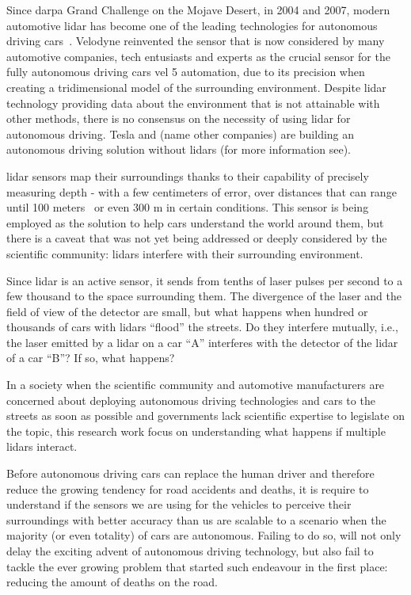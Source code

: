 Since \ac{darpa} Grand Challenge on the Mojave Desert, in 2004 and 2007, modern automotive \ac{lidar} has become one of the leading technologies for autonomous driving cars~\cite{Bezemek2017}. Velodyne reinvented the sensor that is now considered by many automotive companies, tech entusiasts and experts as the crucial sensor for the fully autonomous driving cars vel 5 automation, due to its precision when creating a tridimensional  model of the surrounding environment. Despite \ac{lidar} technology providing data about the environment that is not attainable with other methods, there is no consensus on the necessity of using \ac{lidar} for autonomous driving. Tesla and (name other companies) are building an autonomous driving solution without \acp{lidar} (for more information see). 


\ac{lidar} sensors map their surroundings thanks to their capability of precisely measuring depth - with a few centimeters of error, over distances that can range until 100 meters~\cite{vlp16, Sullivan2016} or even 300 m in certain conditions. This sensor is being employed as the solution to help cars understand the world around them, but there is a caveat that was not yet being addressed or deeply considered by the scientific community: \acp{lidar} interfere with their surrounding environment.

Since \ac{lidar} is an active sensor, it sends from tenths of laser pulses per second to a few thousand to the space surrounding them. The divergence of the laser and the field of view of the detector are small, but what happens when hundred or thousands of cars with \acp{lidar} ``flood'' the streets. Do they interfere mutually, i.e., the laser emitted by a \ac{lidar} on a car ``A'' interferes with the detector of the \ac{lidar} of a car ``B''? If so, what happens? 

In a society when the scientific community and automotive manufacturers are concerned about deploying autonomous driving technologies and cars to the streets as soon as possible and governments lack scientific expertise to legislate on the topic, this research work focus on understanding what happens if multiple \acp{lidar} interact.

Before autonomous driving cars can replace the human driver and therefore reduce the growing tendency for road accidents and deaths, it is require to understand if the sensors we are using for the vehicles to perceive their surroundings with better accuracy than us are scalable to a scenario when the majority (or even totality) of cars are autonomous. Failing to do so, will not only delay the exciting advent of autonomous driving technology, but also fail to tackle the ever growing problem that started such endeavour in the first place: reducing the amount of deaths on the road.

